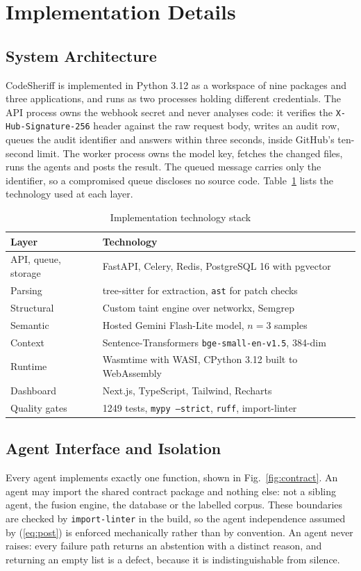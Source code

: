 \documentclass[conference]{IEEEtran}
\begin{document}
\section{Implementation Details} \label{IMP}

\subsection{System Architecture}
CodeSheriff is implemented in Python 3.12 as a workspace of nine packages
and three applications, and runs as two processes holding different
credentials. The API process owns the webhook secret and never analyses
code: it verifies the \texttt{X-Hub-Signature-256} header against the raw
request body, writes an audit row, queues the audit identifier and answers
within three seconds, inside GitHub's ten-second limit. The worker process
owns the model key, fetches the changed files, runs the agents and posts
the result. The queued message carries only the identifier, so a
compromised queue discloses no source code. Table~\ref{tab:stack} lists the
technology used at each layer.

\begin{table}[t]
\centering
\caption{Implementation technology stack}
\label{tab:stack}
\footnotesize
\setlength{\tabcolsep}{3pt}
\begin{tabular}{p{1.9cm}p{5.9cm}}
\toprule
Layer & Technology \\
\midrule
API, queue, storage & FastAPI, Celery, Redis, PostgreSQL 16 with pgvector \\
Parsing       & tree-sitter for extraction, \texttt{ast} for patch checks \\
Structural    & Custom taint engine over networkx, Semgrep~\cite{semgrep} \\
Semantic      & Hosted Gemini Flash-Lite model, $n=3$ samples \\
Context       & Sentence-Transformers \texttt{bge-small-en-v1.5}, 384-dim \\
Runtime       & Wasmtime with WASI, CPython 3.12 built to WebAssembly \\
Dashboard     & Next.js, TypeScript, Tailwind, Recharts \\
Quality gates & 1249 tests, \texttt{mypy --strict}, \texttt{ruff}, import-linter \\
\bottomrule
\end{tabular}
\end{table}

\subsection{Agent Interface and Isolation}
Every agent implements exactly one function, shown in
Fig.~\ref{fig:contract}. An agent may import the shared contract package
and nothing else: not a sibling agent, the fusion engine, the database or
the labelled corpus. These boundaries are checked by
\texttt{import-linter} in the build, so the agent independence assumed by
(\ref{eq:post}) is enforced mechanically rather than by convention. An
agent never raises: every failure path returns an abstention with a
distinct reason, and returning an empty list is a defect, because it is
indistinguishable from silence.
\end{document}
